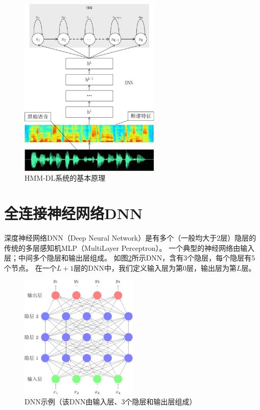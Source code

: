 \begin{figure}[htbp]
\centering
\includegraphics[width=0.6\textwidth]{figures/chapter3/hmmdnn-crop}
\caption{HMM-DL系统的基本原理}
\label{fig:hmmdnn}
\end{figure}


\section{全连接神经网络DNN}

深度神经网络DNN（Deep Neural Network）是有多个（一般均大于2层）隐层的传统的多层感知机MLP（MultiLayer Perceptron）。
一个典型的神经网络由输入层；中间多个隐层和输出层组成。
如图\ref{fig:dnn}所示DNN，含有3个隐层，每个隐层有5个节点。
在一个$L+1$层的DNN中，我们定义输入层为第$0$层，输出层为第$L$层。

\begin{figure}[htbp]
\centering
\includegraphics[width=0.5\textwidth]{figures/chapter3/dnn-crop}
\caption{DNN示例（该DNN由输入层、3个隐层和输出层组成）}
\label{fig:dnn}
\end{figure}

